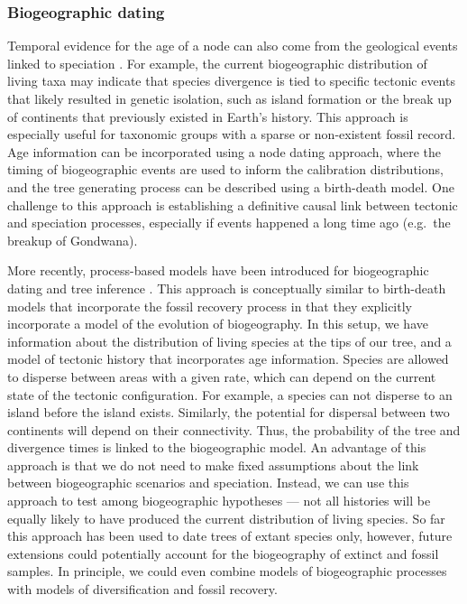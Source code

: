
\subsubsection{Biogeographic dating}

Temporal evidence for the age of a node can also come from the geological events linked to speciation \citep{Ho2015,deBaets2016}.
For example, the current biogeographic distribution of living taxa may indicate that species divergence is tied to specific tectonic events that likely resulted in genetic isolation, such as island formation or the break up of continents that previously existed  in Earth's history.
This approach is especially useful for taxonomic groups with a sparse or non-existent fossil record.
Age information can be incorporated using a node dating approach, where the timing of biogeographic events are used to inform the calibration distributions, and the tree generating process can be described using a birth-death model.
One challenge to this approach is establishing a definitive causal link between tectonic and speciation processes, especially if events happened a long time ago (e.g.\ the breakup of Gondwana).


More recently, process-based models have been introduced for biogeographic dating and tree inference \citep{Landis2016,Landis2019}.
This approach is conceptually similar to birth-death models that incorporate the fossil recovery process in that they explicitly incorporate a model of the evolution of biogeography.
In this setup, we have information about the distribution of living species at the tips of our tree, and a model of tectonic history that incorporates age information. 
Species are allowed to disperse between areas with a given rate, which can depend on the current state of the tectonic configuration.
For example, a species can not disperse to an island before the island exists. 
Similarly, the potential for dispersal between two continents will depend on their connectivity.
Thus, the probability of the tree and divergence times is linked to the biogeographic model.
An advantage of this approach is that we do not need to make fixed assumptions about the link between biogeographic scenarios and speciation.
Instead, we can use this approach to test among biogeographic hypotheses --- not all histories will be equally likely to have produced the current distribution of living species.
So far this approach has been used to date trees of extant species only, however, future extensions could potentially account for the biogeography of extinct and fossil samples.
In principle, we could even combine models of biogeographic processes with models of diversification and fossil recovery. 

